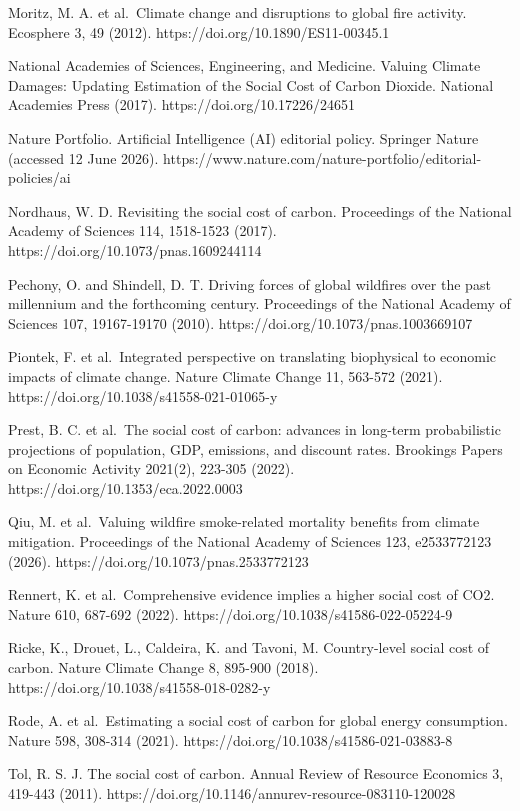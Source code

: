 \documentclass[12pt]{article}
\begin{document}
Moritz, M. A. et al.~Climate change and disruptions to global fire
activity. Ecosphere 3, 49 (2012). https://doi.org/10.1890/ES11-00345.1

National Academies of Sciences, Engineering, and Medicine. Valuing
Climate Damages: Updating Estimation of the Social Cost of Carbon
Dioxide. National Academies Press (2017). https://doi.org/10.17226/24651

Nature Portfolio. Artificial Intelligence (AI) editorial policy.
Springer Nature (accessed 12 June 2026).
https://www.nature.com/nature-portfolio/editorial-policies/ai

Nordhaus, W. D. Revisiting the social cost of carbon. Proceedings of the
National Academy of Sciences 114, 1518-1523 (2017).
https://doi.org/10.1073/pnas.1609244114

Pechony, O. and Shindell, D. T. Driving forces of global wildfires over
the past millennium and the forthcoming century. Proceedings of the
National Academy of Sciences 107, 19167-19170 (2010).
https://doi.org/10.1073/pnas.1003669107

Piontek, F. et al.~Integrated perspective on translating biophysical to
economic impacts of climate change. Nature Climate Change 11, 563-572
(2021). https://doi.org/10.1038/s41558-021-01065-y

Prest, B. C. et al.~The social cost of carbon: advances in long-term
probabilistic projections of population, GDP, emissions, and discount
rates. Brookings Papers on Economic Activity 2021(2), 223-305 (2022).
https://doi.org/10.1353/eca.2022.0003

Qiu, M. et al.~Valuing wildfire smoke-related mortality benefits from
climate mitigation. Proceedings of the National Academy of Sciences 123,
e2533772123 (2026). https://doi.org/10.1073/pnas.2533772123

Rennert, K. et al.~Comprehensive evidence implies a higher social cost
of CO2. Nature 610, 687-692 (2022).
https://doi.org/10.1038/s41586-022-05224-9

Ricke, K., Drouet, L., Caldeira, K. and Tavoni, M. Country-level social
cost of carbon. Nature Climate Change 8, 895-900 (2018).
https://doi.org/10.1038/s41558-018-0282-y

Rode, A. et al.~Estimating a social cost of carbon for global energy
consumption. Nature 598, 308-314 (2021).
https://doi.org/10.1038/s41586-021-03883-8

Tol, R. S. J. The social cost of carbon. Annual Review of Resource
Economics 3, 419-443 (2011).
https://doi.org/10.1146/annurev-resource-083110-120028
\end{document}
